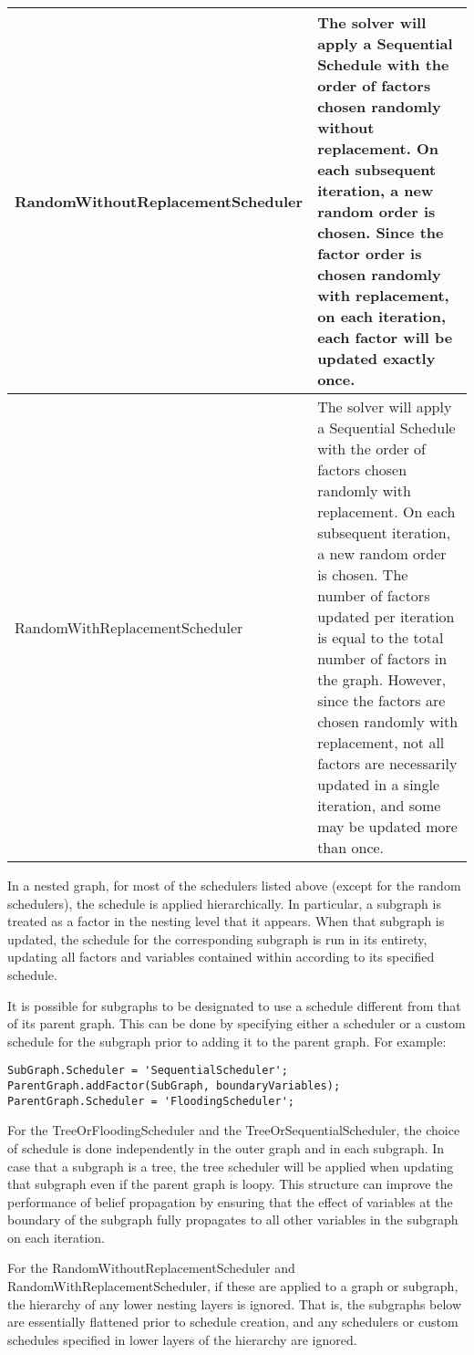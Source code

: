 \begin{longtable}{l p{4in}}
%
\textsf{RandomWithoutReplacementScheduler} & The solver will apply a Sequential Schedule with the order of factors chosen randomly without replacement.  On each subsequent iteration, a new random order is chosen.  Since the factor order is chosen randomly with replacement, on each iteration, each factor will be updated exactly once. \\ \hline
%
\textsf{RandomWithReplacementScheduler} & The solver will apply a Sequential Schedule with the order of factors chosen randomly with replacement.  On each subsequent iteration, a new random order is chosen.  The number of factors updated per iteration is equal to the total number of factors in the graph. However, since the factors are chosen randomly with replacement, not all factors are necessarily updated in a single iteration, and some may be updated more than once. \\ \hline
%
\end{longtable}


In a nested graph, for most of the schedulers listed above (except for the random schedulers), the schedule is applied hierarchically.  In particular, a subgraph is treated as a factor in the nesting level that it appears.  When that subgraph is updated, the schedule for the corresponding subgraph is run in its entirety, updating all factors and variables contained within according to its specified schedule.

It is possible for subgraphs to be designated to use a schedule different from that of its parent graph.  This can be done by specifying either a scheduler or a custom schedule for the subgraph prior to adding it to the parent graph.  For example:
%
\begin{lstlisting}
SubGraph.Scheduler = 'SequentialScheduler';
ParentGraph.addFactor(SubGraph, boundaryVariables);
ParentGraph.Scheduler = 'FloodingScheduler';
\end{lstlisting}

For the TreeOrFloodingScheduler and the TreeOrSequentialScheduler, the choice of schedule is done independently in the outer graph and in each subgraph.  In case that a subgraph is a tree, the tree scheduler will be applied when updating that subgraph even if the parent graph is loopy.  This structure can improve the performance of belief propagation by ensuring that the effect of variables at the boundary of the subgraph fully propagates to all other variables in the subgraph on each iteration.

For the RandomWithoutReplacementScheduler and RandomWithReplacementScheduler, if these are applied to a graph or subgraph, the hierarchy of any lower nesting layers is ignored.  That is, the subgraphs below are essentially flattened prior to schedule creation, and any schedulers or custom schedules specified in lower layers of the hierarchy are ignored.


